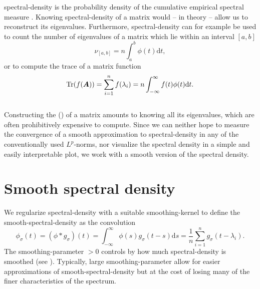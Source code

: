 \gls{spectral-density} is the probability density \cite{klenke2013probability}
of the cumulative empirical spectral measure \cite{chen2021slq}. Knowing \gls{spectral-density}
of a matrix would -- in theory -- allow us to reconstruct its eigenvalues.
Furthermore, \gls{spectral-density} can for example be used to count
the number of eigenvalues of a matrix which lie within an interval $[a, b]$
\begin{equation}
    \nu_{[a, b]} = n \int_{a}^{b} \phi(t) \mathrm{d}t,
    \label{equ:1-introduction-eigenvalue-counting}
\end{equation}
or to compute the trace of a matrix function \cite{lin2017randomized}
\begin{equation}
    \operatorname{Tr}(f(\boldsymbol{A})) = \sum_{i=1}^n f(\lambda_i) = n \int_{-\infty}^{\infty} f(t) \phi(t) \mathrm{d}t.
    \label{equ:1-introduction-matrix-trace}
\end{equation}\\

Constructing the  ()
of a matrix amounts to knowing all its eigenvalues, which are often prohibitively
expensive to compute. Since we can neither hope to measure the convergence
of a smooth approximation to \gls{spectral-density} in any of the conventionally
used $L^p$-norms, nor visualize the spectral density in a simple
and easily interpretable plot, we work with a
smooth version of the spectral density.


\section{Smooth spectral density}
\label{sec:1-introduction-properties}

We regularize \gls{spectral-density} with a suitable \gls{smoothing-kernel}
to define the \gls{smooth-spectral-density} as the convolution
\begin{equation}
    \phi_{\sigma}(t) = (\phi \ast g_{\sigma})(t) = \int_{-\infty}^{\infty} \phi(s) g_{\sigma}(t - s) \mathrm{d}s = \frac{1}{n} \sum_{i=1}^{n} g_{\sigma}(t - \lambda_i).
    \label{equ:1-introduction-def-smooth-spectral-density}
\end{equation}
The \gls{smoothing-parameter} $>0$ controls by how much \gls{spectral-density} is
smoothed (see ). Typically,
large \gls{smoothing-parameter} allow for easier approximations of \gls{smooth-spectral-density}
but at the cost of losing many of the finer characteristics of the spectrum.\\

